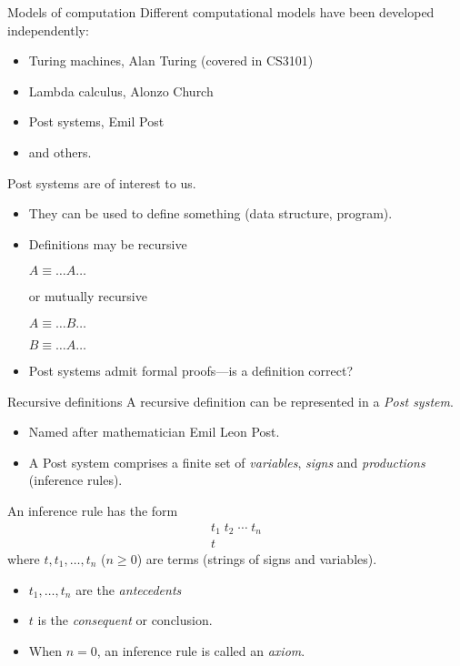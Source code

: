 %

\begin{wideslide}[bm=,toc=]{Models of computation}
Different computational models have been developed independently:
\begin{itemize}
\item<2->Turing machines, Alan Turing (covered in CS3101)
\item<3->Lambda calculus, Alonzo Church
\item<4->Post systems, Emil Post
\item<5->and others.
\end{itemize}
\pause[5] Post systems are of interest to us.
\begin{itemize}
\item<7-> They can be used to define something (data structure, program).
\item<8-> Definitions may be recursive \pause[3]

\hspace{2em}$A \equiv \ldots A\ldots$ \pause

or mutually recursive \pause

\hspace{2em}$A \equiv \ldots B\ldots$

\hspace{2em}$B \equiv \ldots A\ldots$

\item<12-> Post systems admit formal proofs---is a definition correct?
\end{itemize}
\end{wideslide}

\begin{wideslide}[bm=,toc=]{Recursive definitions}
A recursive definition can be represented in a {\em Post system\/}.
\begin{itemize}
\item<2-> Named after mathematician Emil Leon Post.
\item<3-> A Post system comprises a finite set of {\em variables\/}, {\em signs\/} and {\em productions\/} 
(inference rules).
\end{itemize}
\pause[3]
An inference rule has the form 
\pause
\begin{displaymath}
\begin{array}{c}
t_1\;t_2\;\cdots\;t_n\\
\hline
t
\end{array}
\end{displaymath}
\pause
where $t,t_1,\ldots ,t_n$ ($n\geq 0$) are terms (strings of signs and variables).
\begin{itemize}
\item<7-> $t_1,\ldots , t_n$ are the {\em antecedents\/}
\item<8-> $t$ is the {\em consequent\/} or conclusion.
\item<9-> When $n=0$, an inference rule is called an {\em axiom\/}.
\end{itemize}
\end{wideslide}

